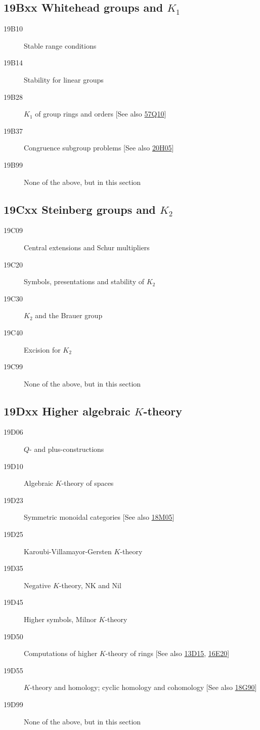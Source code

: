 \documentclass[letterpaper]{article}
\begin{document}
\subsection*{19Bxx  Whitehead groups and $K_1$ }\label{19Bxx}
\begin{description}  
\item [19B10]\label{19B10} Stable range conditions
\item [19B14]\label{19B14} Stability for linear groups
\item [19B28]\label{19B28} $K_1$ of group rings and orders [See also \hyperref[57Q10]{57Q10}]
\item [19B37]\label{19B37} Congruence subgroup problems [See also \hyperref[20H05]{20H05}]
\item [19B99]\label{19B99} None of the above, but in this section
\end{description}
\subsection*{19Cxx  Steinberg groups and $K_2$ }\label{19Cxx}
\begin{description}  
\item [19C09]\label{19C09} Central extensions and Schur multipliers
\item [19C20]\label{19C20} Symbols, presentations and stability of $K_2$
\item [19C30]\label{19C30} $K_2$ and the Brauer group
\item [19C40]\label{19C40} Excision for $K_2$
\item [19C99]\label{19C99} None of the above, but in this section
\end{description}
\subsection*{19Dxx  Higher algebraic $K$-theory }\label{19Dxx}
\begin{description}  
\item [19D06]\label{19D06} $Q$- and plus-constructions
\item [19D10]\label{19D10} Algebraic $K$-theory of spaces
\item [19D23]\label{19D23} Symmetric monoidal categories [See also \hyperref[18M05]{18M05}]
\item [19D25]\label{19D25} Karoubi-Villamayor-Gersten $K$-theory
\item [19D35]\label{19D35} Negative $K$-theory, NK and Nil
\item [19D45]\label{19D45} Higher symbols, Milnor $K$-theory
\item [19D50]\label{19D50} Computations of higher $K$-theory of rings [See also \hyperref[13D15]{13D15}, \hyperref[16E20]{16E20}]
\item [19D55]\label{19D55} $K$-theory and homology; cyclic homology and cohomology [See also \hyperref[18G90]{18G90}]
\item [19D99]\label{19D99} None of the above, but in this section
\end{description}
\end{document}
